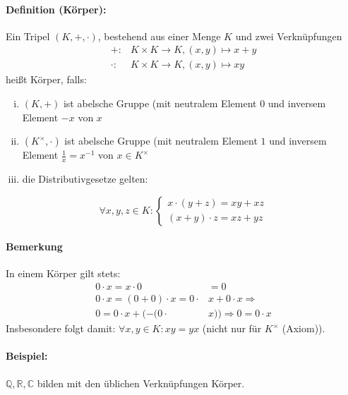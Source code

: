 \documentclass[12pt,a4paper,parskip=half-,DIV=15]{scrartcl}
\begin{document}
\paragraph{Definition (Körper):} Ein Tripel $(K,+,\cdot)$, bestehend aus einer Menge $K$ und zwei Verknüpfungen
\begin{align*}
+:&K\times K\to K,(x,y)\mapsto x+y\\
\cdot : &K\times K\to K, (x,y)\mapsto xy
\end{align*}
heißt Körper, falls:
\begin{enumerate}[(i)]
\item $(K,+)$ ist abelsche Gruppe (mit neutralem Element $0$ und inversem Element $-x$ von $x$
\item $(K^\times,\cdot)$ ist abelsche Gruppe (mit neutralem Element $1$ und inversem Element $\frac{1}{x} = x^{-1}$ von $x\in K^\times$
\item die Distributivgesetze gelten:
\end{enumerate}
\begin{equation*}
\forall x,y,z\in K :\begin{cases}x\cdot (y+z) = xy+xz\\ (x+y)\cdot z = xz+yz \end{cases}
\end{equation*}

\paragraph{Bemerkung} In einem Körper gilt stets:
\begin{align*}
0\cdot x = x\cdot 0 &= 0\\
0\cdot x = (0+0)\cdot x = 0\cdot &x + 0\cdot x \Rightarrow\\
0 = 0\cdot x + (-(0\cdot &x)) \Rightarrow 0 = 0\cdot x
\end{align*}
Insbesondere folgt damit: $\forall x,y\in K: xy = yx$ (nicht nur für $K^\times$ (Axiom)).
\paragraph{Beispiel:} $\mathbb{Q,R,C}$ bilden mit den üblichen Verknüpfungen Körper.

\end{document}

